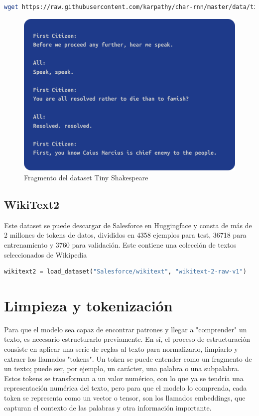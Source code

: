 \documentclass[11pt]{book}
\theoremstyle{plain}
\theoremstyle{definition}
\begin{document}
\begin{lstlisting}[language=bash]
wget https://raw.githubusercontent.com/karpathy/char-rnn/master/data/tinyshakespeare/input.txt -O tinyshakespeare.txt
\end{lstlisting}
\begin{figure}[h]
    \centering
    \includegraphics[width=0.5\linewidth]{img/tiny_shakespeare.png}
    \caption{Fragmento del dataset Tiny Shakespeare}
    \label{fig:placeholder1}
\end{figure}
\subsection{WikiText2}
Este dataset se puede descargar de Salesforce en Huggingface y consta de más de 2 millones de tokens de datos, divididos en 4358 ejemplos para test, 36718 para entrenamiento y 3760 para validación. Este contiene una colección de textos seleccionados de Wikipedia \parencite{huggingface_wikitext} \parencite{autonlp2020linkedwikitext}

\begin{lstlisting}[language=Python]
wikitext2 = load_dataset("Salesforce/wikitext", "wikitext-2-raw-v1")
\end{lstlisting}

\section{Limpieza y tokenización}
Para que el modelo sea capaz de encontrar patrones y llegar a "comprender" un texto, es necesario estructurarlo previamente. En sí, el proceso de estructuración consiste en aplicar una serie de reglas al texto para normalizarlo, limpiarlo y extraer los llamados "tokens". Un token se puede entender como un fragmento de un texto; puede ser, por ejemplo, un carácter, una palabra o una subpalabra. Estos tokens se transforman a un valor numérico, con lo que ya se tendría una representación numérica del texto, pero para que el modelo lo comprenda, cada token se representa como un vector o tensor, son los llamados embeddings, que capturan el contexto de las palabras y otra información importante. \parencite{lmpo2020bpe}
\end{document}
